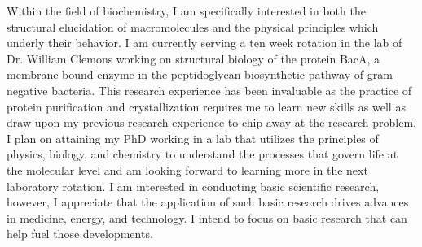 \documentclass[12pt]{report}
\begin{document}
\indent Within the field of biochemistry, I am specifically interested in both the structural elucidation of macromolecules and the physical principles which underly their behavior. I am currently serving a ten week rotation in the lab of Dr. William Clemons working on structural biology of the protein BacA, a membrane bound enzyme in the peptidoglycan biosynthetic pathway of gram negative bacteria. This research experience has been invaluable as the practice of protein purification and crystallization requires me to learn new skills as well as draw upon my previous research experience to chip away at the research problem. I plan on attaining my PhD working in a lab that utilizes the principles of physics, biology, and chemistry to understand the processes that govern life at the molecular level and am looking forward to learning more in the next laboratory rotation. I am interested in conducting basic scientific research, however, I appreciate that the application of such basic research drives advances in medicine, energy, and technology. I intend to focus on basic research that can help fuel those developments. 
\end{document}
